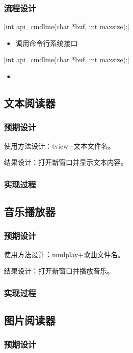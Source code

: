     \subsubsection{流程设计}
    
    \csingle|int api_cmdline(char *buf, int maxsize);|
    \begin{itemize}
      \item 调用命令行系统接口
    \end{itemize}
    \csingle|int api_cmdline(char *buf, int maxsize);|
    \begin{itemize}
      \item 
    \end{itemize}
\subsection{文本阅读器}

    \subsubsection{预期设计}

    使用方法设计：tview+文本文件名。

    结果设计：打开新窗口并显示文本内容。
    \subsubsection{实现过程}

\subsection{音乐播放器}
    \subsubsection{预期设计}

    使用方法设计：mmlplay+歌曲文件名。

    结果设计：打开新窗口并播放音乐。
    \subsubsection{实现过程}

\subsection{图片阅读器}
    \subsubsection{预期设计}

